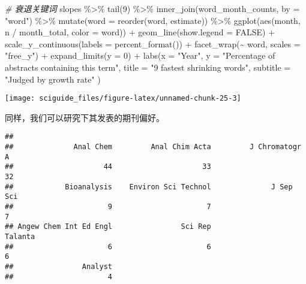 \documentclass[]{tufte-book}
\newenvironment{Shaded}{}{}
\newcommand{\AttributeTok}[1]{\textcolor[rgb]{0.49,0.56,0.16}{#1}}
\newcommand{\CommentTok}[1]{\textcolor[rgb]{0.38,0.63,0.69}{\textit{#1}}}
\newcommand{\ConstantTok}[1]{\textcolor[rgb]{0.53,0.00,0.00}{#1}}
\newcommand{\DecValTok}[1]{\textcolor[rgb]{0.25,0.63,0.44}{#1}}
\newcommand{\FunctionTok}[1]{\textcolor[rgb]{0.02,0.16,0.49}{#1}}
\newcommand{\NormalTok}[1]{#1}
\newcommand{\SpecialCharTok}[1]{\textcolor[rgb]{0.25,0.44,0.63}{#1}}
\newcommand{\StringTok}[1]{\textcolor[rgb]{0.25,0.44,0.63}{#1}}
\begin{document}
\begin{Shaded}
\begin{Highlighting}[]
\CommentTok{\# 衰退关键词}
\NormalTok{slopes }\SpecialCharTok{\%\textgreater{}\%}
  \FunctionTok{tail}\NormalTok{(}\DecValTok{9}\NormalTok{) }\SpecialCharTok{\%\textgreater{}\%}
  \FunctionTok{inner\_join}\NormalTok{(word\_month\_counts, }\AttributeTok{by =} \StringTok{"word"}\NormalTok{) }\SpecialCharTok{\%\textgreater{}\%}
  \FunctionTok{mutate}\NormalTok{(}\AttributeTok{word =} \FunctionTok{reorder}\NormalTok{(word, estimate)) }\SpecialCharTok{\%\textgreater{}\%}
  \FunctionTok{ggplot}\NormalTok{(}\FunctionTok{aes}\NormalTok{(month, n }\SpecialCharTok{/}\NormalTok{ month\_total, }\AttributeTok{color =}\NormalTok{ word)) }\SpecialCharTok{+}
  \FunctionTok{geom\_line}\NormalTok{(}\AttributeTok{show.legend =} \ConstantTok{FALSE}\NormalTok{) }\SpecialCharTok{+}
  \FunctionTok{scale\_y\_continuous}\NormalTok{(}\AttributeTok{labels =} \FunctionTok{percent\_format}\NormalTok{()) }\SpecialCharTok{+}
  \FunctionTok{facet\_wrap}\NormalTok{(}\SpecialCharTok{\textasciitilde{}}\NormalTok{ word, }\AttributeTok{scales =} \StringTok{"free\_y"}\NormalTok{) }\SpecialCharTok{+}
  \FunctionTok{expand\_limits}\NormalTok{(}\AttributeTok{y =} \DecValTok{0}\NormalTok{) }\SpecialCharTok{+}
  \FunctionTok{labs}\NormalTok{(}\AttributeTok{x =} \StringTok{"Year"}\NormalTok{,}
       \AttributeTok{y =} \StringTok{"Percentage of abstracts containing this term"}\NormalTok{,}
       \AttributeTok{title =} \StringTok{"9 fastest shrinking words"}\NormalTok{,}
       \AttributeTok{subtitle =} \StringTok{"Judged by growth rate"}
\NormalTok{              )}
\end{Highlighting}
\end{Shaded}

\texttt{[image: sciguide\_files/figure-latex/unnamed-chunk-25-3]}

同样，我们可以研究下其发表的期刊偏好。

\begin{Shaded}
\end{Shaded}

\begin{verbatim}
## 
##              Anal Chem         Anal Chim Acta         J Chromatogr A 
##                     44                     33                     32 
##            Bioanalysis    Environ Sci Technol              J Sep Sci 
##                      9                      7                      7 
## Angew Chem Int Ed Engl                Sci Rep                Talanta 
##                      6                      6                      6 
##                Analyst 
##                      4
\end{verbatim}
\end{document}
